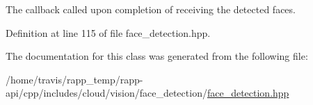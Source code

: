 The callback called upon completion of receiving the detected faces. 



Definition at line 115 of file face\-\_\-detection.\-hpp.



The documentation for this class was generated from the following file\-:\begin{DoxyCompactItemize}
\item 
/home/travis/rapp\-\_\-temp/rapp-\/api/cpp/includes/cloud/vision/face\-\_\-detection/\hyperlink{face__detection_8hpp}{face\-\_\-detection.\-hpp}\end{DoxyCompactItemize}
